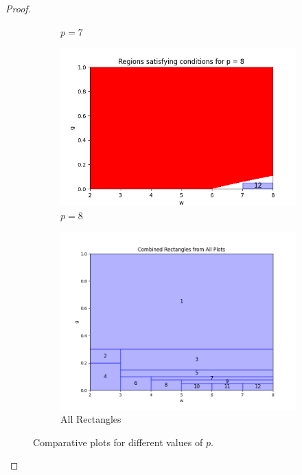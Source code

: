 \documentclass{article}
\begin{document}
\begin{proof}
\begin{figure}[ht]
\begin{subfigure}{0.32\textwidth}
        \caption{$p = 7$}
    \end{subfigure}
    \hfill
    \begin{subfigure}{0.32\textwidth}
        \includegraphics[width=\linewidth]{plotsexcom/plot_p_8.png}
        \caption{$p = 8$}
    \end{subfigure}
    \begin{subfigure}{0.32\textwidth}
        \includegraphics[width=\linewidth]{plotsexcom/rectanglesall.png}
        \caption{All Rectangles}
    \end{subfigure}
    \caption{Comparative plots for different values of $p$.}
    \label{fig:all_plots}
\end{figure}


\end{proof}
\end{document}
